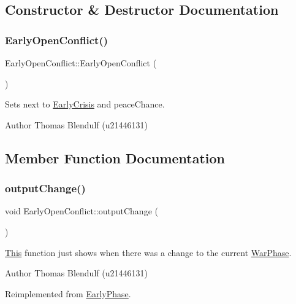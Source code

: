 \subsection{Constructor \& Destructor Documentation}
\mbox{\label{class_early_open_conflict_a40fea65b091222fde271c9161b200c0a}} 
\subsubsection{\texorpdfstring{EarlyOpenConflict()}{EarlyOpenConflict()}}
{\footnotesize\ttfamily Early\+Open\+Conflict\+::\+Early\+Open\+Conflict (\begin{DoxyParamCaption}{ }\end{DoxyParamCaption})}



Sets next to \mbox{\hyperlink{class_early_crisis}{Early\+Crisis}} and peace\+Chance. 

\begin{DoxyAuthor}{Author}
Thomas Blendulf (u21446131) 
\end{DoxyAuthor}


\subsection{Member Function Documentation}
\mbox{\label{class_early_open_conflict_a5326352607a97d660280fc97da533cf6}} 
\subsubsection{\texorpdfstring{outputChange()}{outputChange()}}
{\footnotesize\ttfamily void Early\+Open\+Conflict\+::output\+Change (\begin{DoxyParamCaption}{ }\end{DoxyParamCaption})\hspace{0.3cm}{\ttfamily [virtual]}}



\mbox{\hyperlink{class_this}{This}} function just shows when there was a change to the current \mbox{\hyperlink{class_war_phase}{War\+Phase}}. 

\begin{DoxyAuthor}{Author}
Thomas Blendulf (u21446131) 
\end{DoxyAuthor}


Reimplemented from \mbox{\hyperlink{class_early_phase_a4dec6915b8c177199bc2b92a49fdb3af}{Early\+Phase}}.

